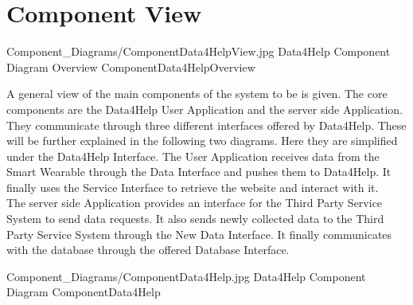 \documentclass[../../DD.tex]{subfiles}
\begin{document}
\section{Component View\label{sect:2.2}}

	\image {13cm} {Component_Diagrams/ComponentData4HelpView.jpg} {Data4Help Component Diagram Overview} {ComponentData4HelpOverview}

	A general view of the main components of the system to be is given. The core components are the Data4Help User Application and the server side Application. They communicate through three different interfaces offered by Data4Help. These will be further explained in the following two diagrams. Here they are simplified under the Data4Help Interface. The User Application receives data from the Smart Wearable through the Data Interface and pushes them to Data4Help. It finally uses the Service Interface to retrieve the  website and interact with it.\\
	The server side Application provides an interface for the Third Party Service System to send data requests. It also sends newly collected data to the Third Party Service System through the New Data Interface. It finally communicates with the database through the offered Database Interface.

	\image {13cm} {Component_Diagrams/ComponentData4Help.jpg} {Data4Help Component Diagram} {ComponentData4Help}
\end{document}
